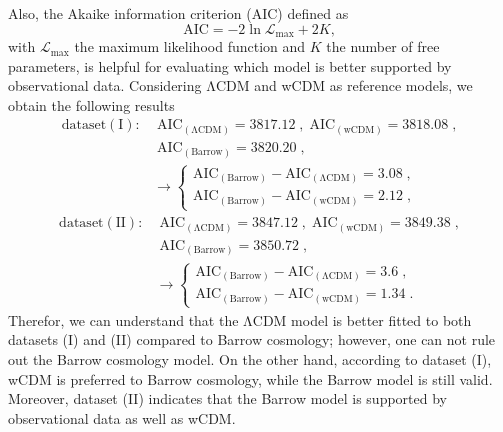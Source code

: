 \documentclass[11pt,twocolumn]{article}
\begin{document}
Also, the Akaike information criterion (AIC) defined as
\cite{aic1,aic2}
    \begin{equation}
    \mathrm{AIC}=-2\ln{\mathcal{L}_{\mathrm{max}}}+2K ,
    \end{equation}
with $\mathcal{L}_{\mathrm{max}}$ the maximum likelihood function
and $K$ the number of free parameters, is helpful for evaluating
which model is better supported by observational data. Considering
$\mathrm{\Lambda}$CDM and wCDM as reference models, we obtain the following results
    \begin{align*}
    \mathrm{dataset (I):}& \; \mathrm{AIC_{(\Lambda CDM)}}=3817.12 \;,\; \mathrm{AIC_{(wCDM)}}=3818.08 \;, \\
    & \; \mathrm{AIC_{(Barrow)}}=3820.20 \;, \\
    &\to \left\{ 
    \begin{array}{l} 
    \mathrm{AIC_{(Barrow)}}-\mathrm{AIC_{(\Lambda CDM)}}=3.08 \;, \\
    \mathrm{AIC_{(Barrow)}}-\mathrm{AIC_{(wCDM)}}=2.12 \;,
    \end{array} \right.
    \end{align*}
    \begin{align*}
    \mathrm{dataset (II):}& \; \mathrm{AIC_{(\Lambda CDM)}}=3847.12 \;,\; \mathrm{AIC_{(wCDM)}}=3849.38 \;, \\
    & \; \mathrm{AIC_{(Barrow)}}=3850.72 \;, \\
    &\to \left\{ 
    \begin{array}{l} 
    \mathrm{AIC_{(Barrow)}}-\mathrm{AIC_{(\Lambda CDM)}}=3.6 \;, \\
    \mathrm{AIC_{(Barrow)}}-\mathrm{AIC_{(wCDM)}}=1.34 \;.
    \end{array} \right.
    \end{align*}
Therefor, we can understand that the $\mathrm{\Lambda}$CDM model is better
fitted to both datasets (I) and (II) compared to Barrow cosmology;
however, one can not rule out the Barrow cosmology model. 
On the other hand, according to dataset (I), wCDM 
is preferred to Barrow cosmology, while the Barrow model is still valid. 
Moreover, dataset (II) indicates that the Barrow model is supported by 
observational data as well as wCDM.
\end{document}
